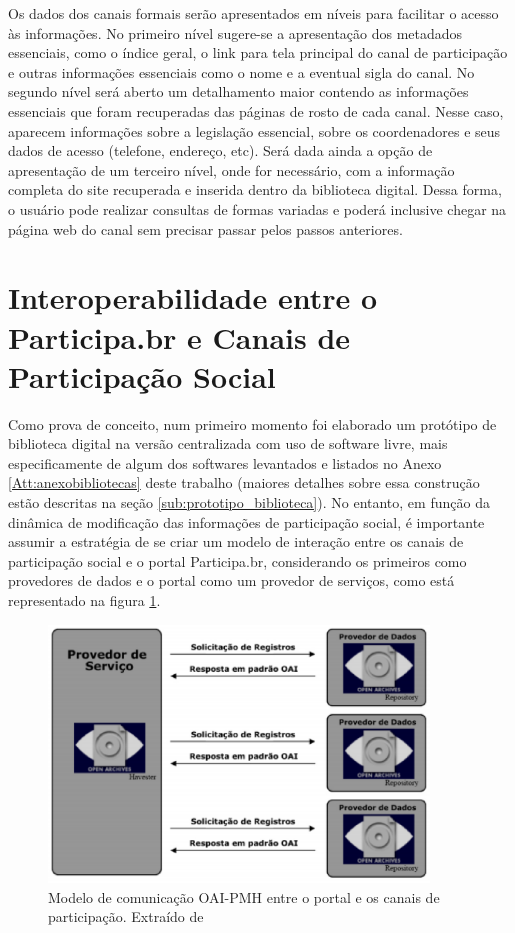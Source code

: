 Os dados dos canais formais serão apresentados em níveis para facilitar o acesso às informações. No primeiro nível sugere-se a apresentação dos metadados essenciais, como o índice geral, o link para tela principal do canal de participação e outras informações essenciais como o nome e a eventual sigla do canal. No segundo nível será aberto um detalhamento maior contendo as informações essenciais que foram recuperadas das páginas de rosto de cada canal. Nesse caso, aparecem informações sobre a legislação essencial, sobre os coordenadores e seus dados de acesso (telefone, endereço, etc). Será dada ainda a opção de apresentação de um terceiro nível, onde for necessário, com a informação completa do site recuperada e inserida dentro da biblioteca digital. Dessa forma, o usuário pode realizar consultas de formas variadas e poderá inclusive chegar na página web do canal sem precisar passar pelos passos anteriores.

\section{Interoperabilidade entre o Participa.br e Canais de Participação Social}
\label{sec:interparticipa}

Como prova de conceito, num primeiro momento foi elaborado um protótipo de biblioteca digital na versão centralizada com uso de software livre, mais especificamente de algum dos softwares levantados e listados no Anexo \ref{Att:anexobibliotecas} deste trabalho (maiores detalhes sobre essa construção estão descritas na seção \ref{sub:prototipo_biblioteca}). No entanto, em função da dinâmica de modificação das informações de participação social, é importante assumir a estratégia de se criar um modelo de interação entre os canais de participação social e o portal Participa.br, considerando os primeiros como provedores de dados e o portal como um provedor de serviços, como está representado na figura \ref{fig:modeloaipmh}.

\graphicspath{{figuras/}}
\begin{figure}[H]
\centering
\includegraphics[width=0.9\textwidth]{modelo-oaipmh}
\caption[Modelo de comunicação OAI-PMH entre o portal e os mecanismos]{Modelo de comunicação OAI-PMH entre o portal e os canais de participação. Extraído de \cite{renan2009interoperabilidade}}
\label{fig:modeloaipmh}
\end{figure}

